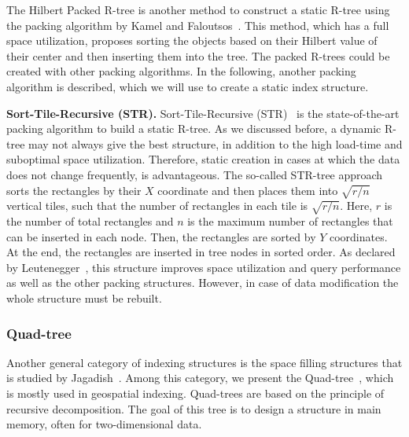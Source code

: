 \documentclass[a4paper,12pt]{article}
\begin{document}
The Hilbert Packed R-tree is another method to construct a static R-tree using the packing algorithm by Kamel and Faloutsos~\cite{hilbert-rtree}. This method, which has a full space utilization, proposes sorting the objects based on their Hilbert value of their center and then inserting them into the tree.
The packed R-trees could be created with other packing algorithms. In the following, another packing algorithm is described, which we will use to create a static index structure.

\textbf{Sort-Tile-Recursive (STR).} Sort-Tile-Recursive (STR)~\cite{strtree} is the state-of-the-art packing algorithm to build a static R-tree. As we discussed before, a dynamic R-tree may not always give the best structure, in addition to the high load-time and suboptimal space utilization. Therefore, static creation in cases at which the data does not change frequently, is advantageous. The so-called STR-tree approach sorts the rectangles by their $X$ coordinate and then places them into $\sqrt{r/n}$ vertical tiles, such that the number of rectangles in each tile is $\sqrt{r/n}$. Here, $r$ is the number of total rectangles and $n$ is the maximum number of rectangles that can be inserted in each node. Then, the rectangles are sorted by $Y$ coordinates. At the end, the rectangles are inserted in tree nodes in sorted order.
As declared by Leutenegger~\cite{strtree}, this structure improves space utilization and query performance as well as the other packing structures. However, in case of data modification the whole structure must be rebuilt.

\subsubsection{Quad-tree}
\label{quad-tree-based}
Another general category of indexing structures is the space filling structures that is studied by Jagadish~\cite{spacefilling}.
Among this category, we present the Quad-tree~\cite{quadtree}, which is mostly used in geospatial indexing. Quad-trees are based on the principle of recursive decomposition. The goal of this tree is to design a structure in main memory, often for two-dimensional data. 
\end{document}
